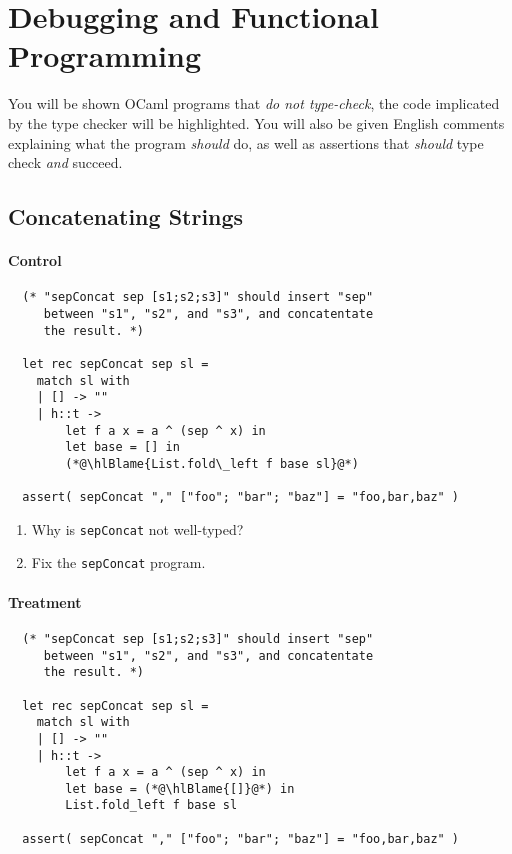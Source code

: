 \documentclass{article}
\newcommand\hlBlame[1]{\colorbox{red!25}{#1}}
\begin{document}
\section{Debugging and Functional Programming}

You will be shown OCaml programs that \emph{do not type-check}, the code
implicated by the type checker will be \hlBlame{highlighted}. You will
also be given English comments explaining what the program \emph{should}
do, as well as assertions that \emph{should} type check \emph{and} succeed.


\subsection{Concatenating Strings}

\paragraph{Control}
\begin{lstlisting}
  (* "sepConcat sep [s1;s2;s3]" should insert "sep"
     between "s1", "s2", and "s3", and concatentate
     the result. *)

  let rec sepConcat sep sl =
    match sl with
    | [] -> ""
    | h::t ->
        let f a x = a ^ (sep ^ x) in
        let base = [] in
        (*@\hlBlame{List.fold\_left f base sl}@*)

  assert( sepConcat "," ["foo"; "bar"; "baz"] = "foo,bar,baz" )
\end{lstlisting}

\begin{enumerate}
\item Why is \verb!sepConcat! not well-typed?
\item Fix the \verb!sepConcat! program.
\end{enumerate}

\paragraph{Treatment}
\begin{lstlisting}
  (* "sepConcat sep [s1;s2;s3]" should insert "sep"
     between "s1", "s2", and "s3", and concatentate
     the result. *)

  let rec sepConcat sep sl =
    match sl with
    | [] -> ""
    | h::t ->
        let f a x = a ^ (sep ^ x) in
        let base = (*@\hlBlame{[]}@*) in
        List.fold_left f base sl

  assert( sepConcat "," ["foo"; "bar"; "baz"] = "foo,bar,baz" )
\end{lstlisting}
\end{document}
